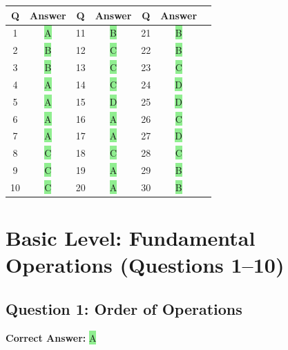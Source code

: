 \documentclass[12pt]{article}
\begin{document}
\begin{table}[h]
\centering
\small
\begin{tabular}{|c|c|c|c|c|c|c|}
\hline
\textbf{Q} & \textbf{Answer} & \textbf{Q} & \textbf{Answer} & \textbf{Q} & \textbf{Answer} \\
\hline
1 & \colorbox{lightgreen}{A} & 11 & \colorbox{lightgreen}{B} & 21 & \colorbox{lightgreen}{B} \\
\hline
2 & \colorbox{lightgreen}{B} & 12 & \colorbox{lightgreen}{C} & 22 & \colorbox{lightgreen}{B} \\
\hline
3 & \colorbox{lightgreen}{B} & 13 & \colorbox{lightgreen}{C} & 23 & \colorbox{lightgreen}{C} \\
\hline
4 & \colorbox{lightgreen}{A} & 14 & \colorbox{lightgreen}{C} & 24 & \colorbox{lightgreen}{D} \\
\hline
5 & \colorbox{lightgreen}{A} & 15 & \colorbox{lightgreen}{D} & 25 & \colorbox{lightgreen}{D} \\
\hline
6 & \colorbox{lightgreen}{A} & 16 & \colorbox{lightgreen}{A} & 26 & \colorbox{lightgreen}{C} \\
\hline
7 & \colorbox{lightgreen}{A} & 17 & \colorbox{lightgreen}{A} & 27 & \colorbox{lightgreen}{D} \\
\hline
8 & \colorbox{lightgreen}{C} & 18 & \colorbox{lightgreen}{C} & 28 & \colorbox{lightgreen}{C} \\
\hline
9 & \colorbox{lightgreen}{C} & 19 & \colorbox{lightgreen}{A} & 29 & \colorbox{lightgreen}{B} \\
\hline
10 & \colorbox{lightgreen}{C} & 20 & \colorbox{lightgreen}{A} & 30 & \colorbox{lightgreen}{B} \\
\hline
\end{tabular}
\end{table}

\newpage

\tableofcontents
\newpage

\section{Basic Level: Fundamental Operations (Questions 1--10)}

\subsection{Question 1: Order of Operations}

\textbf{Correct Answer: } \colorbox{lightgreen}{A}
\end{document}
